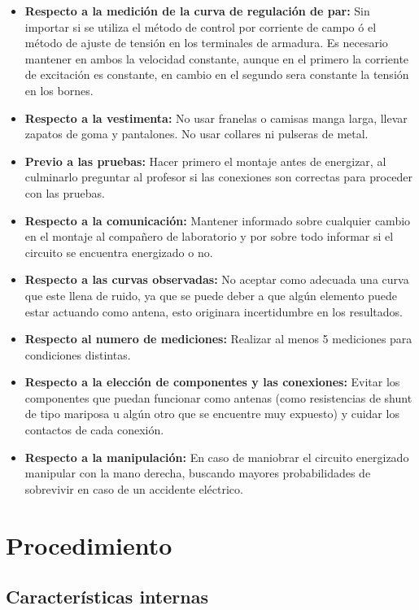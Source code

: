 \documentclass[11pt,letterpaper]{article}     %
\begin{document}
\begin{itemize}
    \item  \textbf{Respecto a la medición de la curva de regulación de par:} Sin importar si se utiliza el método de control por corriente de campo ó el método de ajuste de tensión en los terminales de armadura. Es necesario mantener en ambos la velocidad constante, aunque en el primero la corriente de excitación es constante, en cambio en el segundo sera constante la tensión en los bornes.  
    \item \textbf{Respecto a la  vestimenta:} No usar franelas o camisas manga larga, llevar zapatos de goma y pantalones. No usar collares ni pulseras de metal.
    \item \textbf{Previo a las pruebas:} Hacer primero el montaje antes de energizar, al culminarlo preguntar al profesor si las conexiones son correctas para proceder con las pruebas.
    \item \textbf{Respecto a la comunicación:} Mantener informado sobre cualquier cambio en el montaje al compañero de laboratorio y por sobre todo informar si el circuito se encuentra energizado o no.
	\item \textbf{Respecto a las curvas observadas:} No aceptar como adecuada una curva que este llena de ruido, ya que se puede deber a que algún elemento puede estar actuando como antena, esto originara incertidumbre en los resultados.
	\item \textbf{Respecto al numero de mediciones:}
	Realizar al menos 5 mediciones para condiciones distintas.
	\item \textbf{Respecto a la elección de componentes y las conexiones:} Evitar los componentes que puedan funcionar como antenas (como resistencias de shunt de tipo mariposa u algún otro que se encuentre muy expuesto) y cuidar los contactos de cada conexión.
    \item \textbf{Respecto a la manipulación:} En caso de maniobrar el circuito energizado manipular con la mano derecha, buscando mayores probabilidades de sobrevivir en caso de un accidente eléctrico.
\end{itemize}
\section{Procedimiento}
\subsection{Características internas}
\end{document}
